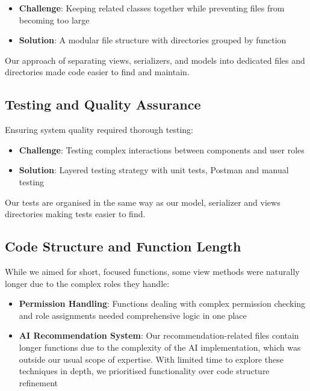 \begin{itemize}
    \item \textbf{Challenge}: Keeping related classes together while preventing files from becoming too large
    \item \textbf{Solution}: A modular file structure with directories grouped by function
\end{itemize}

Our approach of separating views, serializers, and models into dedicated files and directories made code easier to find and maintain.

\subsection{Testing and Quality Assurance}

Ensuring system quality required thorough testing:

\begin{itemize}
    \item \textbf{Challenge}: Testing complex interactions between components and user roles
    \item \textbf{Solution}: Layered testing strategy with unit tests, Postman and manual testing
\end{itemize}

Our tests are organised in the same way as our model, serializer and views directories making tests easier to find.

\subsection{Code Structure and Function Length}
While we aimed for short, focused functions, some view methods were naturally longer due to the complex roles they handle:

\begin{itemize}

    \item \textbf{Permission Handling}: Functions dealing with complex permission checking and role assignments needed comprehensive logic in one place
    
    \item \textbf{AI Recommendation System}: Our recommendation-related files contain longer functions due to the complexity of the AI implementation, which was outside our usual scope of expertise. With limited time to explore these techniques in depth, we prioritised functionality over code structure refinement
\end{itemize}


